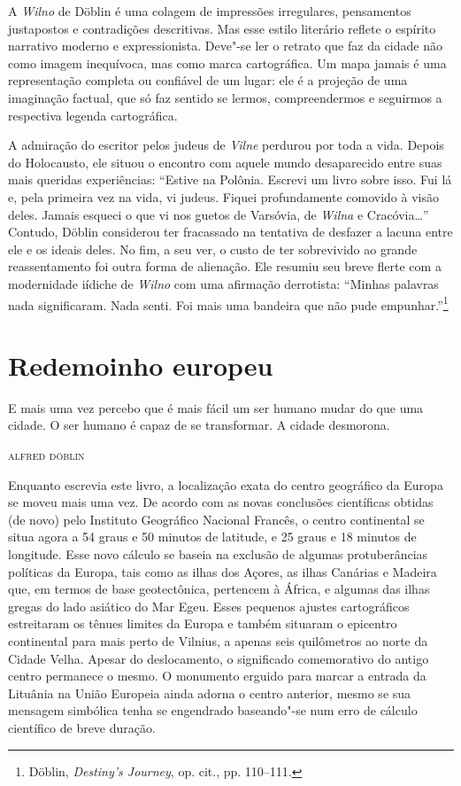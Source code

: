 A \textit{Wilno} de Döblin é uma colagem de impressões irregulares, pensamentos
justapostos e contradições descritivas. Mas esse estilo literário
reflete o espírito narrativo moderno e expressionista. Deve"-se ler o
retrato que faz da cidade não como imagem inequívoca, mas como marca
cartográfica. Um mapa jamais é uma representação completa ou confiável
de um lugar: ele é a projeção de uma imaginação factual, que só faz
sentido se lermos, compreendermos e seguirmos a respectiva legenda
cartográfica.

A admiração do escritor pelos judeus de \textit{Vilne} perdurou por toda a vida.
Depois do Holocausto, ele situou o encontro com aquele mundo
desaparecido entre suas mais queridas experiências: ``Estive na Polônia.
Escrevi um livro sobre isso. Fui lá e, pela primeira vez na vida, vi
judeus. Fiquei profundamente comovido à visão deles. Jamais esqueci o
que vi nos guetos de Varsóvia, de \textit{Wilna} e Cracóvia\ldots{}'' Contudo,
Döblin considerou ter fracassado na tentativa de desfazer a lacuna entre
ele e os ideais deles. No fim, a seu ver, o custo de ter sobrevivido ao
grande reassentamento foi outra forma de alienação. Ele resumiu seu
breve flerte com a modernidade iídiche de \textit{Wilno} com uma afirmação
derrotista: ``Minhas palavras nada significaram. Nada senti. Foi mais
uma bandeira que não pude empunhar.''\footnote{Döblin, \textit{Destiny's Journey}, op. cit., pp. 110--111.}


\chapter[Redemoinho europeu \medskip]{Redemoinho europeu}

\epigraph{E mais uma vez percebo que é mais fácil um ser humano mudar do que uma
cidade. O ser humano é capaz de se transformar. A cidade desmorona.}{\textsc{alfred döblin}}

Enquanto escrevia este livro, a localização exata do centro geográfico
da Europa se moveu mais uma vez. De acordo com as novas conclusões
científicas obtidas (de novo) pelo Instituto Geográfico Nacional
Francês, o centro continental se situa agora a 54 graus e 50 minutos de
latitude, e 25 graus e 18 minutos de longitude. Esse novo cálculo se
baseia na exclusão de algumas protuberâncias políticas da Europa, tais
como as ilhas dos Açores, as ilhas Canárias e Madeira que, em termos de
base geotectônica, pertencem à África, e algumas das ilhas gregas do
lado asiático do Mar Egeu. Esses pequenos ajustes cartográficos
estreitaram os tênues limites da Europa e também situaram o epicentro
continental para mais perto de Vilnius, a apenas seis quilômetros ao
norte da Cidade Velha. Apesar do deslocamento, o significado
comemorativo do antigo centro permanece o mesmo. O monumento erguido
para marcar a entrada da Lituânia na União Europeia ainda adorna o
centro anterior, mesmo se sua mensagem simbólica tenha se engendrado
baseando"-se num erro de cálculo científico de breve duração.

